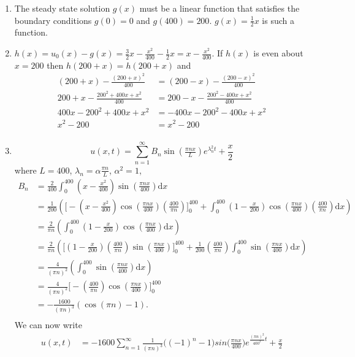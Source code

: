 \documentclass[10pt]{article}
\newcommand*{\pinx}{\left(\tfrac{\pi nx}{400}\right)}
\newcommand*{\nip}{\left(\tfrac{400}{\pi n}\right)}
\newcommand*{\dx}{\text{d}x}
\begin{document}
\begin{enumerate}
    \begin{enumerate}
        \pagebreak
      \item The steady state solution $g(x)$ must be a linear function that
        satisfies the boundary conditions $g(0)  = 0$ and $g(400) = 200$. $g(x)
        = \tfrac{1}{2}x$ is such a function.
      \item $h(x) = u_0(x) - g(x) = \tfrac{3}{2}x - \tfrac{x^2}{400} -
        \frac{1}{2}x = x - \tfrac{x^2}{400}$. If $h(x)$ is even about $x = 200$
        then $h(200 + x) = h(200 + x)$ and
        \begin{align*}
          (200 + x) - \frac{(200 + x)^2}{400} &= (200 - x) - \frac{(200 - x)^2}{400} \\
          200 + x - \frac{200^2 + 400x + x^2}{400} &= 200 - x - \frac{200^2 - 400x + x^2}{400} \\
          400x - 200^2 + 400x + x^2 &= - 400x - 200^2 - 400x + x^2 \\
          x^2 - 200 &= x^2 - 200 \\
        \end{align*}
      \item $$u(x,t) = \sum^\infty_{n=1}B_n\sin\left(\tfrac{\pi nx}{L}\right)e^{\lambda^2_nt} + \frac{x}{2}$$
        where $L=400$, $\lambda_n = \alpha\tfrac{\pi n}{L}$, $\alpha^2 = 1$,
        \begin{align*}
          B_n &= \frac{2}{400}\int_0^{400}(x-\tfrac{x^2}{400})\sin\pinx\dx \\
              &= \frac{1}{200}\left(\Big[- (x - \tfrac{x^2}{400})\cos\pinx\nip\Big]_0^{400} + \int_0^{400}(1 - \tfrac{x}{200})\cos\pinx\nip\dx\right) \\
              &= \frac{2}{\pi n}\left(\int_0^{400}(1 - \tfrac{x}{200})\cos\pinx\dx\right) \\
              &= \frac{2}{\pi n}\left(\Big[(1 - \tfrac{x}{200})\nip\sin\pinx\Big]_0^{400} + \tfrac{1}{200}\nip\int_0^{400}\sin\pinx\dx\right) \\
              &= \frac{4}{(\pi n)^2}\left(\int_0^{400}\sin\pinx\dx\right) \\
              &= \frac{4}{(\pi n)^2}\Big[-\nip\cos\pinx\Big]_0^{400} \\
              &= -\frac{1600}{(\pi n)^3}\left(\cos(\pi n) - 1\right). \\
        \end{align*}
        We can now write
        \begin{align*}
          u(x,t) &= - 1600 \sum^\infty_{n=1}\frac{1}{(\pi n)^3}\big((-1)^n - 1\big)sin\big(\tfrac{\pi nx}{400}\big)e^{\tfrac{(\pi n)^2}{400^2}t} + \frac{x}{2} \\
        \end{align*}
    \end{enumerate}

  \end{enumerate}
\end{document}
